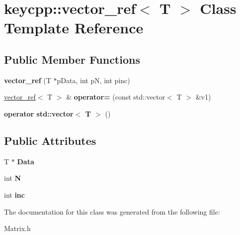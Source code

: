 \hypertarget{classkeycpp_1_1vector__ref}{\section{keycpp\-:\-:vector\-\_\-ref$<$ T $>$ Class Template Reference}
\label{classkeycpp_1_1vector__ref}
}
\subsection*{Public Member Functions}
\begin{DoxyCompactItemize}
\item 
\hypertarget{classkeycpp_1_1vector__ref_ad14717954b6f937c98004312c5197af2}{{\bfseries vector\-\_\-ref} (T $\ast$p\-Data, int p\-N, int pinc)}\label{classkeycpp_1_1vector__ref_ad14717954b6f937c98004312c5197af2}

\item 
\hypertarget{classkeycpp_1_1vector__ref_a2bf36c35b4d369b1ebc5179112faf037}{\hyperlink{classkeycpp_1_1vector__ref}{vector\-\_\-ref}$<$ T $>$ \& {\bfseries operator=} (const std\-::vector$<$ T $>$ \&v1)}\label{classkeycpp_1_1vector__ref_a2bf36c35b4d369b1ebc5179112faf037}

\item 
\hypertarget{classkeycpp_1_1vector__ref_a86f3ed899a141149a179a5825654160a}{{\bfseries operator std\-::vector$<$ T $>$} ()}\label{classkeycpp_1_1vector__ref_a86f3ed899a141149a179a5825654160a}

\end{DoxyCompactItemize}
\subsection*{Public Attributes}
\begin{DoxyCompactItemize}
\item 
\hypertarget{classkeycpp_1_1vector__ref_a8c95ac48e6938ce6ce7d836e48d485f3}{T $\ast$ {\bfseries Data}}\label{classkeycpp_1_1vector__ref_a8c95ac48e6938ce6ce7d836e48d485f3}

\item 
\hypertarget{classkeycpp_1_1vector__ref_a4ad4fbc82897a48a94e39cdc30327f3f}{int {\bfseries N}}\label{classkeycpp_1_1vector__ref_a4ad4fbc82897a48a94e39cdc30327f3f}

\item 
\hypertarget{classkeycpp_1_1vector__ref_a5953ee17f3a63f9c80ae330d9168aade}{int {\bfseries inc}}\label{classkeycpp_1_1vector__ref_a5953ee17f3a63f9c80ae330d9168aade}

\end{DoxyCompactItemize}


The documentation for this class was generated from the following file\-:\begin{DoxyCompactItemize}
\item 
Matrix.\-h\end{DoxyCompactItemize}
